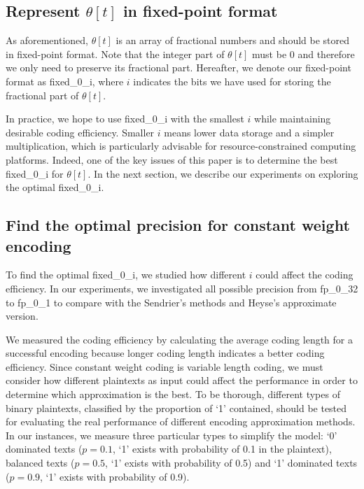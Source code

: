 \documentclass[10pt,journal,compsoc]{IEEEtran}
\begin{document}
\subsection{Represent $\theta [t]$ in fixed-point format}
As aforementioned, $\theta [t]$ is an array of fractional numbers and should be stored in fixed-point format.
Note that the integer part of $\theta [t]$ must be 0 and therefore we only need to preserve its fractional part.
Hereafter, we denote our fixed-point format as fixed\_0\_i,  where $i$ indicates the bits we have used for storing
the fractional part of $\theta [t]$.

In practice, we hope to use fixed\_0\_i with the smallest $i$ while maintaining desirable coding efficiency.
Smaller $i$ means lower data storage and a simpler multiplication, which is particularly advisable for
resource-constrained computing platforms. Indeed,  one of the key issues of this paper is to determine the best fixed\_0\_i
for $\theta [t]$. In the next section, we describe our experiments on exploring the optimal fixed\_0\_i.


\subsection{Find the optimal precision for constant weight encoding}
To find the optimal fixed\_0\_i, we studied how different $i$ could affect the coding efficiency. In our experiments, we investigated
all possible precision from fp\_0\_32 to fp\_0\_1 to compare with the Sendrier's methods\cite{sendrier2005encoding} and
Heyse's approximate version\cite{heyse2010low}.

We measured the coding efficiency by calculating the average coding length for a successful encoding
because longer coding length indicates a better coding efficiency. Since constant weight coding is variable length coding,
we must consider how different plaintexts as input could affect the performance in order to determine
which approximation is the best. To be thorough,  different types of binary plaintexts, classified by the proportion of `1' contained,
should be tested for evaluating the real performance of different encoding approximation methods.
In our instances, we measure three particular types to simplify the model:
`0' dominated texts ($p=0.1$, `1' exists with probability of 0.1 in the plaintext),
balanced texts ($p=0.5$, `1' exists with probability of 0.5)
and `1' dominated texts ($p=0.9$, `1' exists with probability of 0.9).

\end{document}
